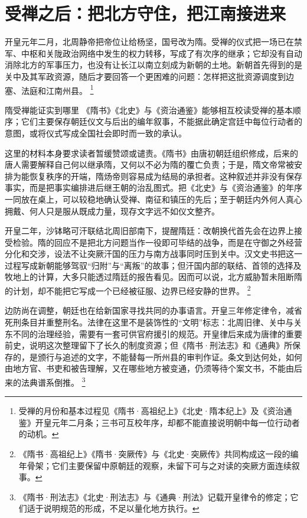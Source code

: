 \section{受禅之后：把北方守住，把江南接进来}
\label{sec:sui-reunification}

开皇元年二月，北周静帝把帝位让给杨坚，国号改为隋。受禅的仪式把一场已在禁军、中枢和关陇政治网络中发生的权力转移，写成了有次序的继承；它却没有自动消除北方的军事压力，也没有让长江以南立刻成为新朝的土地。新朝首先得到的是关中及其军政资源，随后才要回答一个更困难的问题：怎样把这批资源调度到边塞、法庭和江南州县。%
\footnote{受禅的月份和基本过程见《隋书·高祖纪上》《北史·隋本纪上》及《资治通鉴》开皇元年二月条；三书可互校年序，却都不能直接说明朝中每一位行动者的动机。}

\begin{sourcenote}{隋受禅能证实到哪里}
《隋书》《北史》与《资治通鉴》能够相互校读受禅的基本顺序；它们主要保存朝廷仪文与后出的编年叙事，不能据此确定宫廷中每位行动者的意图，或将仪式写成全国社会即时而一致的承认。
\end{sourcenote}

这里的材料本身要求读者暂缓赞颂或谴责。《隋书》由唐初朝廷组织修成，后来的唐人需要解释自己何以继承隋，又何以不必为隋的覆亡负责；于是，隋文帝常被安排为能恢复秩序的开端，隋炀帝则容易成为结局的承担者。这种叙述并非没有保存事实，而是把事实编排进后继王朝的治乱图式。把《北史》与《资治通鉴》的年序一同放在桌上，可以较稳地确认受禅、南征和镇压的先后；至于朝廷内外何人真心拥戴、何人只是服从既成力量，现存文字远不如仪文整齐。

开皇二年，沙钵略可汗联结北周旧部南下，提醒隋廷：改朝换代首先会在边界上接受检验。隋的回应不是把北方问题当作一役即可毕结的战争，而是在守御之外经营分化和交涉，设法不让突厥汗国的压力与南方战事同时压到关中。汉文史书把这一过程写成新朝能够驾驭“归附”与“离叛”的故事；但汗国内部的联结、首领的选择及牧地上的计算，大多只能透过隋廷的报告看见。因而可以说，北方威胁暂未阻断隋的计划，却不能把它写成一个已经被征服、边界已经安静的世界。%
\footnote{《隋书·高祖纪上》《隋书·突厥传》与《北史·突厥传》共同构成这一段的编年骨架；它们主要保留中原朝廷的观察，未留下可与之对读的突厥方面连续叙事。}

边防尚在调整，朝廷也在给新国家寻找共同的办事语言。开皇三年修定律令，减省死刑条目并重整刑名。法律在这里不是装饰性的“文明”标志：北周旧律、关中与关东不同的治理经验，需要有一套可供官府援引的规范。开皇律后来成为唐律的重要前史，说明这次整理留下了长久的制度资源；但《隋书·刑法志》和《通典》所保存的，是颁行与追述的文字，不能替每一所州县的审判作证。条文到达何处，如何由地方官、书吏和被告理解，又在哪些地方被变通，仍须等待个案文书，不能由后来的法典谱系倒推。%
\footnote{《隋书·刑法志》《北史·刑法志》与《通典·刑法》记载开皇律令的修定；它们适于说明规范的形成，不足以量化地方执行。}

